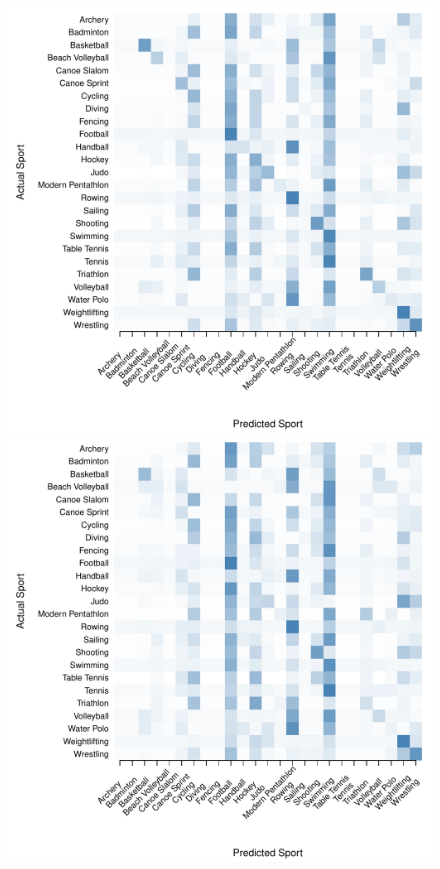 \begin{figure}
\begin{center}
  \begin{minipage}{0.20\textwidth}
    \begin{center}
      \includegraphics[scale=0.20]{../graphics/sportCIT-trn.pdf}
    \end{center}
  \end{minipage}
  \hspace{0.05\textwidth}
  \begin{minipage}{0.20\textwidth}
    \begin{center}
      \includegraphics[scale=0.20]{../graphics/sportCIT-tst.pdf}

\end{center}
\end{minipage}
\end{center}
\end{figure}
